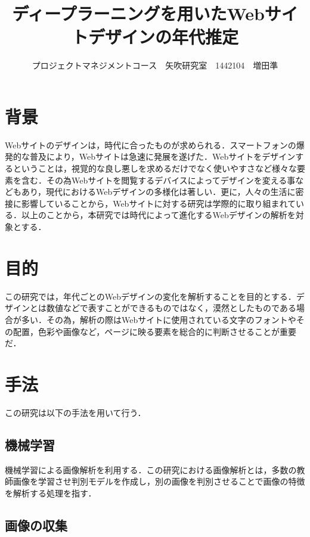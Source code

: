 \documentclass[uplatex,twocolumn,dvipdfmx]{jsarticle}
\title{\vspace{-5mm}\fontsize{14pt}{0pt}\selectfont ディープラーニングを用いたWebサイトデザインの年代推定}
\author{\normalsize プロジェクトマネジメントコース　矢吹研究室　1442104　増田準}
\date{}
\begin{document}
\fontsize{10.5pt}{\baselineskip}\selectfont
\maketitle





\section{背景}

Webサイトのデザインは，時代に合ったものが求められる\cite{bib002}．スマートフォンの爆発的な普及により，Webサイトは急速に発展を遂げた．Webサイトをデザインするということは，視覚的な良し悪しを求めるだけでなく使いやすさなど様々な要素を含む．その為Webサイトを閲覧するデバイスによってデザインを変える事などもあり，現代におけるWebデザインの多様化は著しい．更に，人々の生活に密接に影響していることから，Webサイトに対する研究は学際的に取り組まれている\cite{bib001}．以上のことから，本研究では時代によって進化するWebデザインの解析を対象とする．

\section{目的}

この研究では，年代ごとのWebデザインの変化を解析することを目的とする．デザインとは数値などで表すことができるものではなく，漠然としたものである場合が多い．その為，解析の際はWebサイトに使用されている文字のフォントやその配置，色彩や画像など，ページに映る要素を総合的に判断させることが重要だ．

\section{手法}

この研究は以下の手法を用いて行う．

\subsection{機械学習}

機械学習による画像解析を利用する．この研究における画像解析とは，多数の教師画像を学習させ判別モデルを作成し，別の画像を判別させることで画像の特徴を解析する処理を指す．


\subsection{画像の収集}
\end{document}
